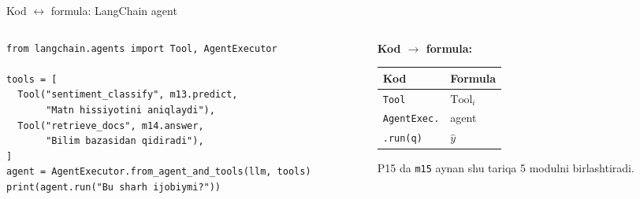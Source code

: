 \documentclass[aspectratio=169,11pt]{beamer}
\begin{document}
\begin{frame}[fragile]{Kod $\leftrightarrow$ formula: LangChain agent}
  \begin{columns}[T]
    \begin{column}{0.58\textwidth}
\begin{lstlisting}
from langchain.agents import Tool, AgentExecutor

tools = [
  Tool("sentiment_classify", m13.predict,
       "Matn hissiyotini aniqlaydi"),
  Tool("retrieve_docs", m14.answer,
       "Bilim bazasidan qidiradi"),
]
agent = AgentExecutor.from_agent_and_tools(llm, tools)
print(agent.run("Bu sharh ijobiymi?"))
\end{lstlisting}
    \end{column}
    \begin{column}{0.38\textwidth}
      \textbf{Kod $\to$ formula:}\\[3pt]
      \footnotesize
      \begin{tabular}{p{1.7cm}p{2.0cm}}
        \toprule
        Kod & Formula \\
        \midrule
        \texttt{Tool} & $\text{Tool}_i$ \\
        \texttt{AgentExec.} & agent \\
        \texttt{.run(q)} & $\hat{y}$ \\
        \bottomrule
      \end{tabular}
      \vspace{4pt}
      \begin{tcolorbox}[okbox,top=2pt,bottom=2pt]
        \footnotesize
        P15 da \texttt{m15} aynan shu tariqa 5 modulni birlashtiradi.
      \end{tcolorbox}
    \end{column}
  \end{columns}
\end{frame}
\end{document}
